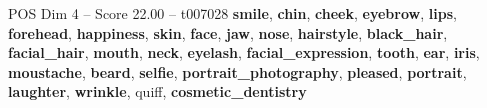 \begin{textsample}{POS Dim 4 – Score 22.00 – t007028}  \label{ex:f4_pos_013}
\textbf{smile}, \textbf{chin}, \textbf{cheek}, \textbf{eyebrow}, \textbf{lips}, \textbf{forehead}, \textbf{happiness}, \textbf{skin}, \textbf{face}, \textbf{jaw}, \textbf{nose}, \textbf{hairstyle}, \textbf{black\_hair}, \textbf{facial\_hair}, \textbf{mouth}, \textbf{neck}, \textbf{eyelash}, \textbf{facial\_expression}, \textbf{tooth}, \textbf{ear}, \textbf{iris}, \textbf{moustache}, \textbf{beard}, \textbf{selfie}, \textbf{portrait\_photography}, \textbf{pleased}, \textbf{portrait}, \textbf{laughter}, \textbf{wrinkle}, quiff, \textbf{cosmetic\_dentistry}

\end{textsample}
